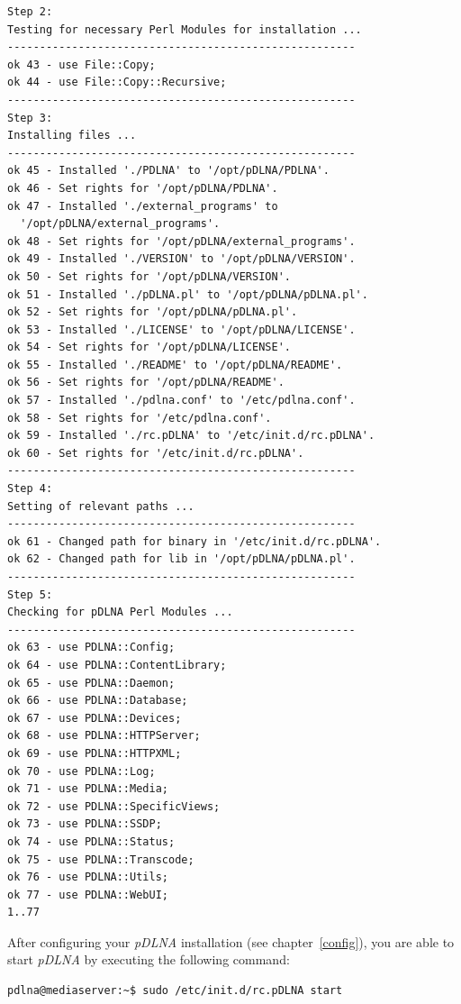 \documentclass[a4paper,oneside,10pt]{report}
\newenvironment{colframecmd}{%
  \begin{Sbox}
    \begin{minipage}{.99\columnwidth}
}{%
  \end{minipage}
  \end{Sbox}
  \begin{center}
    \fcolorbox{black}{LightSteelBlue}{\TheSbox}
  \end{center}
}
\begin{document}
\begin{colframecmd}
\begin{verbatim}
Step 2:
Testing for necessary Perl Modules for installation ...
------------------------------------------------------
ok 43 - use File::Copy;
ok 44 - use File::Copy::Recursive;
------------------------------------------------------
Step 3:
Installing files ...
------------------------------------------------------
ok 45 - Installed './PDLNA' to '/opt/pDLNA/PDLNA'.
ok 46 - Set rights for '/opt/pDLNA/PDLNA'.
ok 47 - Installed './external_programs' to
  '/opt/pDLNA/external_programs'.
ok 48 - Set rights for '/opt/pDLNA/external_programs'.
ok 49 - Installed './VERSION' to '/opt/pDLNA/VERSION'.
ok 50 - Set rights for '/opt/pDLNA/VERSION'.
ok 51 - Installed './pDLNA.pl' to '/opt/pDLNA/pDLNA.pl'.
ok 52 - Set rights for '/opt/pDLNA/pDLNA.pl'.
ok 53 - Installed './LICENSE' to '/opt/pDLNA/LICENSE'.
ok 54 - Set rights for '/opt/pDLNA/LICENSE'.
ok 55 - Installed './README' to '/opt/pDLNA/README'.
ok 56 - Set rights for '/opt/pDLNA/README'.
ok 57 - Installed './pdlna.conf' to '/etc/pdlna.conf'.
ok 58 - Set rights for '/etc/pdlna.conf'.
ok 59 - Installed './rc.pDLNA' to '/etc/init.d/rc.pDLNA'.
ok 60 - Set rights for '/etc/init.d/rc.pDLNA'.
------------------------------------------------------
Step 4:
Setting of relevant paths ...
------------------------------------------------------
ok 61 - Changed path for binary in '/etc/init.d/rc.pDLNA'.
ok 62 - Changed path for lib in '/opt/pDLNA/pDLNA.pl'.
------------------------------------------------------
Step 5:
Checking for pDLNA Perl Modules ...
------------------------------------------------------
ok 63 - use PDLNA::Config;
ok 64 - use PDLNA::ContentLibrary;
ok 65 - use PDLNA::Daemon;
ok 66 - use PDLNA::Database;
ok 67 - use PDLNA::Devices;
ok 68 - use PDLNA::HTTPServer;
ok 69 - use PDLNA::HTTPXML;
ok 70 - use PDLNA::Log;
ok 71 - use PDLNA::Media;
ok 72 - use PDLNA::SpecificViews;
ok 73 - use PDLNA::SSDP;
ok 74 - use PDLNA::Status;
ok 75 - use PDLNA::Transcode;
ok 76 - use PDLNA::Utils;
ok 77 - use PDLNA::WebUI;
1..77
\end{verbatim}
\end{colframecmd}

After configuring your {\em pDLNA} installation (see chapter~\ref{config}), you are able to start {\em pDLNA} by executing the following command:
\begin{colframecmd}
\begin{verbatim}
pdlna@mediaserver:~$ sudo /etc/init.d/rc.pDLNA start
\end{verbatim}
\end{colframecmd}
\end{document}
